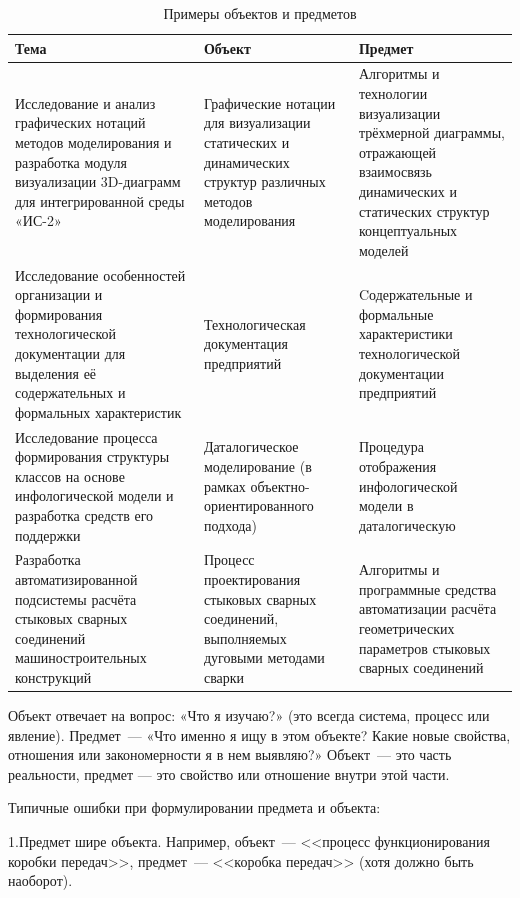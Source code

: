 \begin{table}
	\caption{Примеры объектов  и предметов}%
	\label{tbl:objectsubject}
	\begin{tabularx}{\linewidth}{|>{\raggedright}X|>{\raggedright}X|>{\raggedright\arraybackslash}X|}
	\hline
	\centering \textbf{Тема}	& \centering \textbf{Объект}  & \centering \textbf{Предмет} \arraybackslash \\ \hline
	Исследование и анализ графических нотаций методов моделирования и разработка модуля визуализации 3D-диаграмм для интегрированной среды «ИС-2» &
	Графические нотации для визуализации статических и динамических структур различных методов моделирования &
	Алгоритмы и технологии визуализации трёхмерной диаграммы, отражающей взаимосвязь динамических и статических структур концептуальных моделей 
	\\ \hline
	Исследование особенностей организации и формирования технологической документации для выделения её содержательных и формальных характеристик &
	Технологическая документация предприятий &
	Cодержательные и формальные характеристики технологической документации предприятий 
	\\ \hline
	Исследование процесса формирования структуры классов на
	основе инфологической модели и разработка средств его поддержки &
	Даталогическое моделирование (в рамках объектно-
	ориентированного подхода)&
	Процедура отображения инфологической модели в даталогическую
	\\ \hline
	Разработка автоматизированной подсистемы
	расчёта стыковых сварных соединений машиностроительных
	конструкций &
	Процесс проектирования стыковых сварных соединений, выполняемых дуговыми методами сварки&
	Алгоритмы и программные средства автоматизации расчёта геометрических параметров стыковых сварных соединений 
	\\ \hline	
	\end{tabularx}
\end{table}

Объект отвечает на вопрос: «Что я изучаю?» (это всегда система, процесс или явление). Предмет~--- «Что именно я ищу в этом объекте? Какие новые свойства, отношения или закономерности я в нем выявляю?» Объект~--- это часть реальности, предмет — это свойство или отношение внутри этой части.

Типичные ошибки при формулировании предмета и объекта:

1.\hspace{0.7ex}Предмет шире объекта. Например, объект~--- <<процесс функционирования коробки передач>>, предмет~--- <<коробка передач>> (хотя должно быть наоборот).

